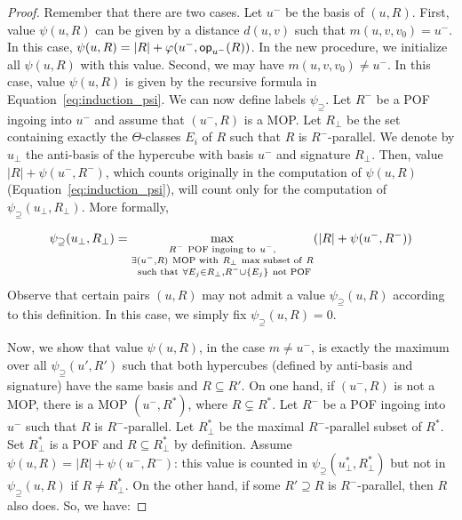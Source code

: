 \documentclass{article}
\newcommand{\set}[1]{\left\{ #1 \right\}}
\newcommand{\card}[1]{\left| #1 \right|}
\newcommand{\opp}{\mbox{\textsf{op}}}
\newcommand{\psis}{\psi_{\supseteq}}
\begin{document}
\begin{proof}
Remember that there are two cases. Let $u^-$ be the basis of $(u,R)$. First, value $\psi(u,R)$ can be given by a distance $d(u,v)$ such that $m(u,v,v_0) = u^-$. In this case, $\psi(u,R) = \card{R} + \varphi(u^-,\opp_{u^-}(R))$. In the new procedure, we initialize all $\psi(u,R)$ with this value. Second, we may have $m(u,v,v_0) \neq u^-$. In this case, value $\psi(u,R)$ is given by the recursive formula in Equation~\eqref{eq:induction_psi}. We can now define labels $\psis$. Let $R^-$ be a POF ingoing into $u^-$ and assume that $(u^-,R)$ is a MOP. Let $R_{\perp}$ be the set containing exactly the $\Theta$-classes $E_i$ of $R$ such that $R$ is $R^-$-parallel. We denote by $u_{\perp}$ the anti-basis of the hypercube with basis $u^-$ and signature $R_{\perp}$. Then, value $\card{R} + \psi(u^-,R^-)$, which counts originally in the computation of $\psi(u,R)$ (Equation~\eqref{eq:induction_psi}), will count only for the computation of $\psis(u_{\perp},R_{\perp})$. More formally,

\begin{equation}
    \psis(u_{\perp},R_{\perp}) = \max\limits_{\substack{R^- ~\mbox{\scriptsize{POF ingoing to}}~ u^-, \\ \exists (u^-,R) ~\mbox{\scriptsize{MOP with}}~ R_{\perp} ~\mbox{\scriptsize{max subset of}}~ R\\ ~\mbox{\scriptsize{such that}}~ \forall E_j \in R_{\perp}, R^- \cup \set{E_j} ~\mbox{\scriptsize{not POF}}}} (\card{R} + \psi(u^-,R^-))
    \label{eq:induction_psi_mop}
\end{equation}
Observe that certain pairs $(u,R)$ may not admit a value $\psis(u,R)$ according to this definition. In this case, we simply fix $\psis(u,R) = 0$.

Now, we show that value $\psi(u,R)$, in the case $m\neq u^-$, is exactly the maximum over all $\psis(u',R')$ such that both hypercubes (defined by anti-basis and signature) have the same basis and $R \subseteq R'$. On one hand, if $(u^-,R)$ is not a MOP, there is a MOP $(u^-,R^*)$, where $R \subsetneq R^*$. Let $R^-$ be a POF ingoing into $u^-$ such that $R$ is $R^-$-parallel. Let $R_{\perp}^*$ be the maximal $R^-$-parallel subset of $R^*$. Set $R_{\perp}^*$ is a POF and $R \subseteq R_{\perp}^*$ by definition. Assume $\psi(u,R) = \card{R} + \psi(u^-,R^-)$: this value is counted in $\psis(u_{\perp}^*,R_{\perp}^*)$ but not in $\psis(u,R)$ if $R\neq R_{\perp}^*$. On the other hand, if some $R' \supseteq R$ is $R^-$-parallel, then $R$ also does. So, we have:


\end{proof}
\end{document}
